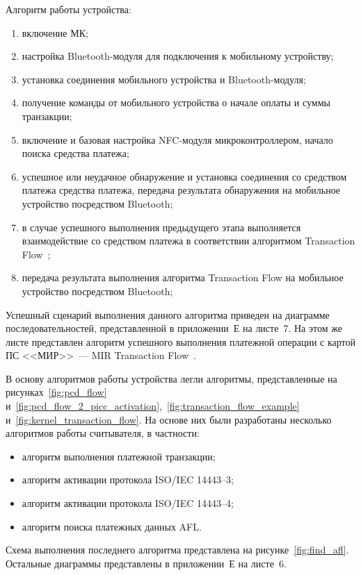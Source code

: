 Алгоритм работы устройства:
\begin{enumerate}
    \item включение МК;
    \item настройка Bluetooth-модуля для подключения к мобильному устройству;
    \item установка соединения мобильного устройства и Bluetooth-модуля;
    \item получение команды от мобильного устройства о начале оплаты и суммы транзакции;
    \item включение и базовая настройка NFC-модуля микроконтроллером, начало поиска средства платежа;
    \item успешное или неудачное обнаружение и установка соединения со средством платежа средства платежа, передача результата обнаружения на мобильное устройство посредством Bluetooth;
    \item в случае успешного выполнения предыдущего этапа выполняется взаимодействие со средством платежа в соответствии алгоритмом Transaction Flow~\cite{book_mir};
    \item передача результата выполнения алгоритма Transaction Flow на мобильное устройство посредством Bluetooth;
\end{enumerate}

Успешный сценарий выполнения данного алгоритма приведен на диаграмме последовательностей, представленной в приложении~Е на листе~7.
На этом же листе представлен алгоритм успешного выполнения платежной операции с картой ПС <<МИР>>~--- MIR Transaction Flow~\cite{book_mir}.

В основу алгоритмов работы устройства легли алгоритмы, представленные на рисунках~\ref{fig:pcd_flow} и~\ref{fig:pcd_flow_2_picc_activation},~\ref{fig:transaction_flow_example} и~\ref{fig:kernel_transaction_flow}.
На основе них были разработаны несколько алгоритмов работы считывателя, в частности:

\begin{itemize}
    \item алгоритм выполнения платежной транзакции;
    \item алгоритм активации протокола ISO/IEC 14443--3;
    \item алгоритм активации протокола ISO/IEC 14443--4;
    \item алгоритм поиска платежных данных AFL.
\end{itemize}

Схема выполнения последнего алгоритма представлена на рисунке~\ref{fig:find_afl}.
Остальные диаграммы представлены в приложении~Е на листе~6.

